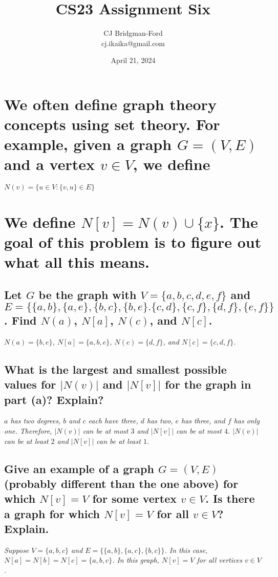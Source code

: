 \documentclass{article}
\title{CS23 Assignment Six}
\author{CJ Bridgman-Ford \\ cj.ikaika@gmail.com}
\date{April 21, 2024}
\begin{document}
\maketitle
\thispagestyle{empty}

\clearpage


\section{We often define graph theory concepts using set theory. For example, given a graph $G=(V,E)$ and a vertex $v \in V$, we define}
\begin{center}
    $N(v) = \{u \in V : \{v,u\}\in E\}$
\end{center}
\section*{\hspace{1cm}We define $N[v]=N(v)\cup\{x\}$. The goal of this problem is to figure out what all this means.}
\subsection{Let $G$ be the graph with $V=\{a,b,c,d,e,f\}$ and $E=\{\{a,b\},\{a,e\},\{b,c\},\{b,e\}.\{c,d\},\{c,f\},\{d,f\},\{e,f\}\}$. Find $N(a)$, $N[a]$, $N(c)$, and $N[c]$.}
\hspace{1cm}\textit{$N(a)=\{b,e\}$, $N[a]=\{a,b,e\}$, $N(c)=\{d,f\}$, and $N[c]=\{c,d,f\}$.}
\subsection{What is the largest and smallest possible values for $|N(v)|$ and $|N[v]|$ for the graph in part (a)? Explain?}
\hspace{1cm}\textit{$a$ has two degrees, $b$ and $c$ each have three, $d$ has two, $e$ has three, and $f$ has only one. Therefore, $|N(v)|$ can be at most $3$ and $|N[v]|$ can be at most $4$. $|N(v)|$ can be at least $2$ and $|N[v]|$ can be at least $1$.}
\subsection{Give an example of a graph $G=(V,E)$ (probably different than the one above) for which $N[v]=V$ for some vertex $v\in V$. Is there a graph for which $N[v]=V$ for all $v \in V$? Explain.}
\hspace{1cm}\textit{Suppose $V = \{a,b,c\}$ and $E = \{\{a,b\},\{a,c\},\{b,c\}\}$. In this case, $N[a]=N[b]=N[c]=\{a,b,c\}$. In this graph, $N[v]=V$ for all vertices $v\in V$.}
\end{document}
